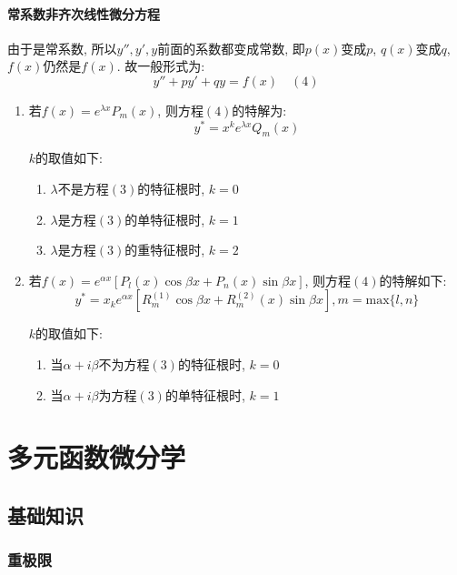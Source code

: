 \subsubsection{常系数非齐次线性微分方程}
由于是常系数, 所以$ y'',y',y $前面的系数都变成常数, 即$ p(x) $变成$ p $, $ q(x) $变成$ q $, $ f(x) $仍然是$ f(x) $. 故一般形式为:
\begin{equation*}
y''+py'+qy=f(x) \quad (4)
\end{equation*}
\begin{enumerate}
\item 若$ f(x)=e^{\lambda x}P_{m}(x) $, 则方程$ (4) $的特解为:
\begin{equation*}
y^{*}=x^{k}e^{\lambda x}Q_{m}(x)
\end{equation*}\par $ k $的取值如下:
\begin{enumerate}
\item $ \lambda $不是方程$ (3) $的特征根时, $ k=0 $
\item $ \lambda $是方程$ (3) $的单特征根时, $ k=1 $
\item $ \lambda $是方程$ (3) $的重特征根时, $ k=2 $
\end{enumerate}
\item 若$ f(x)=e^{\alpha x}[P_{l}(x)\cos \beta x+P_{n}(x)\sin \beta x] $, 则方程$ (4) $的特解如下:
\begin{equation*}
y^{*}=x_{k}e^{\alpha x}[R_{m}^{(1)}\cos \beta x+R_{m}^{(2)}(x)\sin \beta x], m=\mathrm{max}\{l,n\}
\end{equation*}\par $ k $的取值如下:
\begin{enumerate}
\item 当$ \alpha+i\beta $不为方程$ (3) $的特征根时, $ k=0 $
\item 当$ \alpha+i\beta $为方程$ (3) $的单特征根时, $ k=1 $
\end{enumerate}
\end{enumerate}
\chapter{多元函数微分学}
\section{基础知识}
\subsection{重极限}
